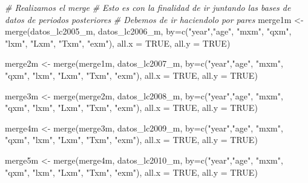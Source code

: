 \documentclass[
]{article}
\newenvironment{Shaded}{\begin{snugshade}}{\end{snugshade}}
\newcommand{\AttributeTok}[1]{\textcolor[rgb]{0.77,0.63,0.00}{#1}}
\newcommand{\CommentTok}[1]{\textcolor[rgb]{0.56,0.35,0.01}{\textit{#1}}}
\newcommand{\ConstantTok}[1]{\textcolor[rgb]{0.00,0.00,0.00}{#1}}
\newcommand{\FunctionTok}[1]{\textcolor[rgb]{0.00,0.00,0.00}{#1}}
\newcommand{\NormalTok}[1]{#1}
\newcommand{\OtherTok}[1]{\textcolor[rgb]{0.56,0.35,0.01}{#1}}
\newcommand{\StringTok}[1]{\textcolor[rgb]{0.31,0.60,0.02}{#1}}
\begin{document}
\begin{Shaded}
\begin{Highlighting}[]
\CommentTok{\# Realizamos el merge}
\CommentTok{\# Esto es con la finalidad de ir juntando las bases de datos de periodos posteriores}
\CommentTok{\# Debemos de ir haciendolo por pares}
\NormalTok{merge1m }\OtherTok{\textless{}{-}} \FunctionTok{merge}\NormalTok{(datos\_lc2005\_m, datos\_lc2006\_m, }\AttributeTok{by=}\FunctionTok{c}\NormalTok{(}\StringTok{"year"}\NormalTok{,}\StringTok{"age"}\NormalTok{, }\StringTok{"mxm"}\NormalTok{, }\StringTok{"qxm"}\NormalTok{, }\StringTok{"lxm"}\NormalTok{, }\StringTok{"Lxm"}\NormalTok{, }\StringTok{"Txm"}\NormalTok{, }\StringTok{"exm"}\NormalTok{), }\AttributeTok{all.x =} \ConstantTok{TRUE}\NormalTok{, }\AttributeTok{all.y =} \ConstantTok{TRUE}\NormalTok{)}

\NormalTok{merge2m }\OtherTok{\textless{}{-}} \FunctionTok{merge}\NormalTok{(merge1m, datos\_lc2007\_m, }\AttributeTok{by=}\FunctionTok{c}\NormalTok{(}\StringTok{"year"}\NormalTok{,}\StringTok{"age"}\NormalTok{, }\StringTok{"mxm"}\NormalTok{, }\StringTok{"qxm"}\NormalTok{, }\StringTok{"lxm"}\NormalTok{, }\StringTok{"Lxm"}\NormalTok{, }\StringTok{"Txm"}\NormalTok{, }\StringTok{"exm"}\NormalTok{), }\AttributeTok{all.x =} \ConstantTok{TRUE}\NormalTok{, }\AttributeTok{all.y =} \ConstantTok{TRUE}\NormalTok{)}

\NormalTok{merge3m }\OtherTok{\textless{}{-}} \FunctionTok{merge}\NormalTok{(merge2m, datos\_lc2008\_m, }\AttributeTok{by=}\FunctionTok{c}\NormalTok{(}\StringTok{"year"}\NormalTok{,}\StringTok{"age"}\NormalTok{, }\StringTok{"mxm"}\NormalTok{, }\StringTok{"qxm"}\NormalTok{, }\StringTok{"lxm"}\NormalTok{, }\StringTok{"Lxm"}\NormalTok{, }\StringTok{"Txm"}\NormalTok{, }\StringTok{"exm"}\NormalTok{), }\AttributeTok{all.x =} \ConstantTok{TRUE}\NormalTok{, }\AttributeTok{all.y =} \ConstantTok{TRUE}\NormalTok{)}

\NormalTok{merge4m }\OtherTok{\textless{}{-}} \FunctionTok{merge}\NormalTok{(merge3m, datos\_lc2009\_m, }\AttributeTok{by=}\FunctionTok{c}\NormalTok{(}\StringTok{"year"}\NormalTok{,}\StringTok{"age"}\NormalTok{, }\StringTok{"mxm"}\NormalTok{, }\StringTok{"qxm"}\NormalTok{, }\StringTok{"lxm"}\NormalTok{, }\StringTok{"Lxm"}\NormalTok{, }\StringTok{"Txm"}\NormalTok{, }\StringTok{"exm"}\NormalTok{), }\AttributeTok{all.x =} \ConstantTok{TRUE}\NormalTok{, }\AttributeTok{all.y =} \ConstantTok{TRUE}\NormalTok{)}

\NormalTok{merge5m }\OtherTok{\textless{}{-}} \FunctionTok{merge}\NormalTok{(merge4m, datos\_lc2010\_m, }\AttributeTok{by=}\FunctionTok{c}\NormalTok{(}\StringTok{"year"}\NormalTok{,}\StringTok{"age"}\NormalTok{, }\StringTok{"mxm"}\NormalTok{, }\StringTok{"qxm"}\NormalTok{, }\StringTok{"lxm"}\NormalTok{, }\StringTok{"Lxm"}\NormalTok{, }\StringTok{"Txm"}\NormalTok{, }\StringTok{"exm"}\NormalTok{), }\AttributeTok{all.x =} \ConstantTok{TRUE}\NormalTok{, }\AttributeTok{all.y =} \ConstantTok{TRUE}\NormalTok{)}


\end{Highlighting}
\end{Shaded}
\end{document}
